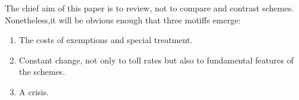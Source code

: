 The chief aim of this paper is to review, not to compare and contrast schemes. Nonetheless,it will be obvious enough that three motiffs emerge: 

\begin{enumerate}
    \item The costs of exemptions and special treatment.
    \item Constant change, not only to toll rates but also to fundamental features of the schemes.
    \item A crisis. 
\end{enumerate}


